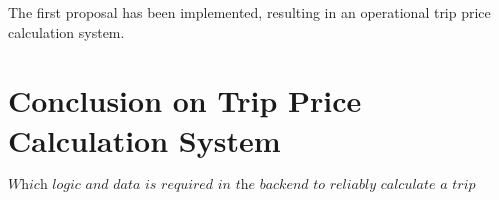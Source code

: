 The first proposal has been implemented, resulting in an operational trip price calculation system.

\section{Conclusion on Trip Price Calculation System}
\[\textit{Which logic and data is required in the backend to reliably calculate a trip price?}\]\hfill

